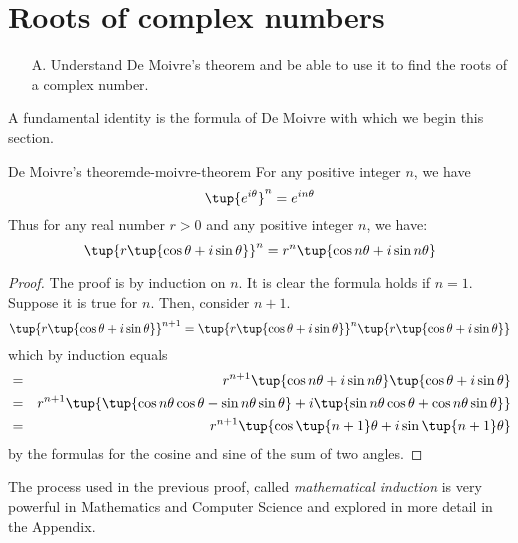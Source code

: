 \section{Roots of complex numbers}

\begin{outcome}
\begin{enumerate}
\item[A.] Understand De Moivre's theorem and be able to use it to find the
roots of a complex number.
\end{enumerate}
\end{outcome}

A fundamental identity is the
 formula of De Moivre with which we begin this section.

\begin{theorem}{De Moivre's theorem}{de-moivre-theorem}
For any positive integer $n$, we have
\begin{equation*}
\tup{e^{i \theta} }^n = e^{i n \theta}
\end{equation*}
Thus for any real number $r>0$ and any positive integer $n$, we have:
\begin{equation*}
\tup{r\tup{\cos \theta+i\sin \theta} } ^{n}=r^{n}\tup{\cos n \theta +i\sin
n\theta} 
\end{equation*}
\end{theorem}

\begin{proof}
 The proof is by induction on $n$. It is clear the formula holds if $n=1.$ Suppose it is true
for $n.$ Then, consider $n+1$.
\begin{equation*}
\tup{r\tup{\cos \theta+i\sin \theta} } ^{n+1}=\tup{r\tup{\cos
\theta+i\sin \theta} } ^{n}\tup{r\tup{\cos \theta+i\sin \theta} }
\end{equation*}
which by induction equals
\begin{eqnarray*}
&=&r^{n+1}\tup{\cos n\theta+i\sin n\theta} \tup{\cos \theta+i\sin \theta} \\
&=& r^{n+1}\tup{\tup{\cos n\theta\cos \theta-\sin n\theta\sin \theta} +i\tup{\sin
n\theta\cos \theta+\cos n\theta\sin \theta} }\\
&=&r^{n+1}\tup{\cos \tup{n+1} \theta+i\sin \tup{n+1} \theta}
\end{eqnarray*}
by the formulas for the cosine and sine of the sum of two angles. 
\end{proof}

The process used in the previous proof, called {\em mathematical
induction\em} is very powerful in Mathematics and Computer Science
and explored in more detail in the Appendix.

